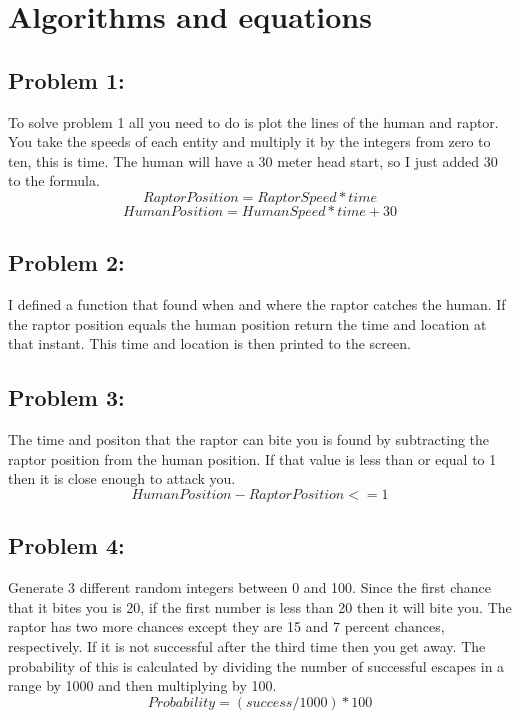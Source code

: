 \documentclass[twocolumn]{revtex4}
\begin{document}
\section{Algorithms and equations} 

\subsection{Problem 1:}
To solve problem 1 all you need to do is plot the lines of the human and raptor. You take the speeds of each entity and multiply it by the integers from zero to ten, this is time. The human will have a 30 meter head start, so I just added 30 to the formula.
	$$ RaptorPosition = RaptorSpeed * time $$
	$$ HumanPosition = HumanSpeed * time +30$$
	
\subsection{Problem 2:} I defined a function that found when and where the raptor catches the human. If the raptor position equals the human position return the time and location at that instant. This time and location is then printed to the screen.

\subsection{Problem 3:} The time and positon that the raptor can bite you is found by subtracting the raptor position from the human position. If that value is less than or equal to 1 then it is close enough to attack you.
$$ HumanPosition - RaptorPosition <= 1$$

\subsection{Problem 4:} Generate 3 different random integers between 0 and 100. Since the first chance that it bites you is 20, if the first number is less than 20 then it will bite you. The raptor has two more chances except they are 15 and 7 percent chances, respectively. If it is not successful after the third time then you get away. The probability of this is calculated by dividing the number of successful escapes in a range by 1000 and then multiplying by 100.
$$Probability = (success/1000) * 100$$
\end{document}
